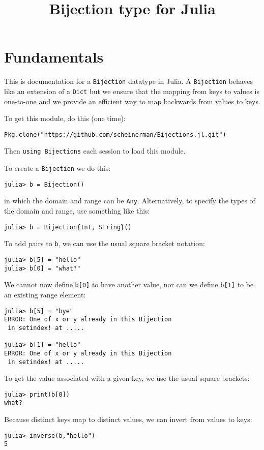 \documentclass[12pt,oneside]{amsart}
\title{Bijection type for Julia}
\begin{document}
\maketitle

\section*{Fundamentals}

This is documentation for a \verb|Bijection| datatype in Julia.  A
\verb|Bijection| behaves like an extension of a \verb|Dict| but we
ensure that the mapping from keys to values is one-to-one and we
provide an efficient way to map backwards from values to keys.

To get this module, do this (one time):
\begin{verbatim}
Pkg.clone("https://github.com/scheinerman/Bijections.jl.git")
\end{verbatim}
Then \verb|using Bijections| each session to load this module. 

To create a \verb|Bijection| we do
this:
\begin{verbatim}
julia> b = Bijection()
\end{verbatim}
in which the domain and range can be \verb|Any|. Alternatively, to
specify the types of the domain and range, use something like this:
\begin{verbatim}
julia> b = Bijection{Int, String}()
\end{verbatim}

To add pairs to \verb|b|, we can use the usual square bracket
notation:
\begin{verbatim}
julia> b[5] = "hello"
julia> b[0] = "what?"
\end{verbatim}
We cannot now define \verb|b[0]| to have another value,
nor can we define \verb|b[1]| to be an existing range element:
\begin{verbatim}
julia> b[5] = "bye"
ERROR: One of x or y already in this Bijection
 in setindex! at .....

julia> b[1] = "hello"
ERROR: One of x or y already in this Bijection
 in setindex! at .....
\end{verbatim}

To get the value associated with a given key, we use the usual square
brackets:
\begin{verbatim}
julia> print(b[0])
what?
\end{verbatim}

Because distinct keys map to distinct values, we can invert from
values to keys:
\begin{verbatim}
julia> inverse(b,"hello")
5
\end{verbatim}
\end{document}
